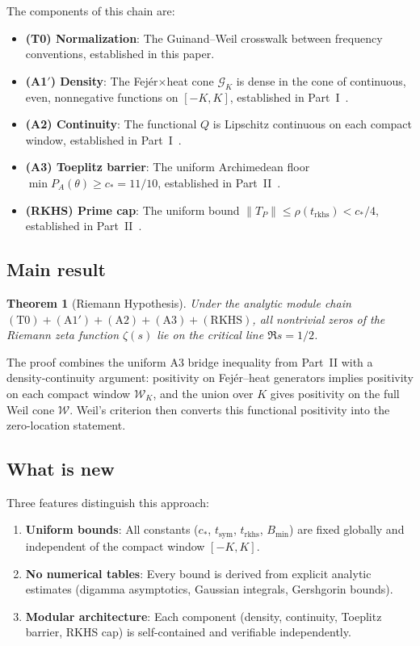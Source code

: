 \documentclass[11pt,a4paper]{article}
\newtheorem{theorem}{Theorem}[section]
\theoremstyle{definition}
\newcommand{\WW}{\mathcal{W}}
\newcommand{\GG}{\mathcal{G}}
\begin{document}
The components of this chain are:
\begin{itemize}
\item \textbf{(T0) Normalization}: The Guinand--Weil crosswalk between frequency conventions, established in this paper.
\item \textbf{(A1$'$) Density}: The Fej\'er$\times$heat cone $\GG_K$ is dense in the cone of continuous, even, nonnegative functions on $[-K,K]$, established in Part~I~\cite{Paper1}.
\item \textbf{(A2) Continuity}: The functional $Q$ is Lipschitz continuous on each compact window, established in Part~I~\cite{Paper1}.
\item \textbf{(A3) Toeplitz barrier}: The uniform Archimedean floor $\min P_A(\theta) \ge c_* = 11/10$, established in Part~II~\cite{Paper2}.
\item \textbf{(RKHS) Prime cap}: The uniform bound $\|T_P\| \le \rho(t_{\mathrm{rkhs}}) < c_*/4$, established in Part~II~\cite{Paper2}.
\end{itemize}

\subsection*{Main result}

\begin{theorem}[Riemann Hypothesis]\label{thm:RH-intro}
Under the analytic module chain $\mathrm{(T0)} + \mathrm{(A1')} + \mathrm{(A2)} + \mathrm{(A3)} + \mathrm{(RKHS)}$, all nontrivial zeros of the Riemann zeta function $\zeta(s)$ lie on the critical line $\Re s = 1/2$.
\end{theorem}

The proof combines the uniform A3 bridge inequality from Part~II with a density-continuity argument: positivity on Fej\'er--heat generators implies positivity on each compact window $\WW_K$, and the union over $K$ gives positivity on the full Weil cone $\WW$. Weil's criterion then converts this functional positivity into the zero-location statement.

\subsection*{What is new}

Three features distinguish this approach:
\begin{enumerate}
\item \textbf{Uniform bounds}: All constants ($c_*$, $t_{\mathrm{sym}}$, $t_{\mathrm{rkhs}}$, $B_{\min}$) are fixed globally and independent of the compact window $[-K,K]$.
\item \textbf{No numerical tables}: Every bound is derived from explicit analytic estimates (digamma asymptotics, Gaussian integrals, Gershgorin bounds).
\item \textbf{Modular architecture}: Each component (density, continuity, Toeplitz barrier, RKHS cap) is self-contained and verifiable independently.
\end{enumerate}
\end{document}
